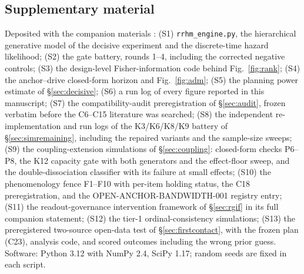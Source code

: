 \documentclass[9pt,twocolumn]{article}
\begin{document}
\subsection*{Supplementary material}
Deposited with the companion materials \cite{lahtee2026ru}: (S1) \texttt{rrhm\_engine.py}, the hierarchical generative model of the decisive experiment and the discrete-time hazard likelihood; (S2) the gate battery, rounds 1--4, including the corrected negative controls; (S3) the design-level Fisher-information code behind Fig.~\ref{fig:rank}; (S4) the anchor--drive closed-form horizon and Fig.~\ref{fig:adm}; (S5) the planning power estimate of \S\ref{sec:decisive}; (S6) a run log of every figure reported in this manuscript; (S7) the compatibility-audit preregistration of \S\ref{sec:audit}, frozen verbatim before the C6--C15 literature was searched; (S8) the independent re-implementation and run logs of the K3/K6/K8/K9 battery of \S\ref{sec:simremaining}, including the repaired variants and the sample-size sweeps; (S9) the coupling-extension simulations of \S\ref{sec:coupling}: closed-form checks P6--P8, the K12 capacity gate with both generators and the effect-floor sweep, and the double-dissociation classifier with its failure at small effects; (S10) the phenomenology fence F1--F10 with per-item holding status, the C18 preregistration, and the OPEN-ANCHOR-BANDWIDTH-001 registry entry; (S11) the readout-governance intervention framework of \S\ref{sec:rgif} in its full companion statement; (S12) the tier-1 ordinal-consistency simulations; (S13) the preregistered two-source open-data test of \S\ref{sec:firstcontact}, with the frozen plan (C23), analysis code, and scored outcomes including the wrong prior guess. Software: Python 3.12 with NumPy 2.4, SciPy 1.17; random seeds are fixed in each script.
\end{document}
